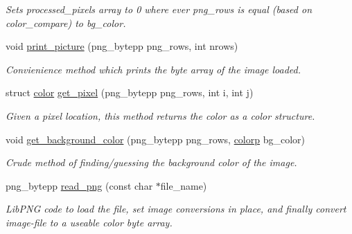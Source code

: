 \begin{DoxyCompactItemize}
\begin{DoxyCompactList}\small\item\em Sets processed\_\-pixels array to 0 where ever png\_\-rows is equal (based on color\_\-compare) to bg\_\-color. \item\end{DoxyCompactList}\item 
void \hyperlink{group__funcs_ga15a4db2e181f3ceef79a9bdd00d66866}{print\_\-picture} (png\_\-bytepp png\_\-rows, int nrows)
\begin{DoxyCompactList}\small\item\em Convienience method which prints the byte array of the image loaded. \item\end{DoxyCompactList}\item 
struct \hyperlink{structcolor}{color} \hyperlink{group__funcs_ga9f3d1acaa22f9aca948afcf487f6f850}{get\_\-pixel} (png\_\-bytepp png\_\-rows, int i, int j)
\begin{DoxyCompactList}\small\item\em Given a pixel location, this method returns the color as a color structure. \item\end{DoxyCompactList}\item 
void \hyperlink{group__funcs_gabc288f9283da15ec44a4200b0b1f0e7b}{get\_\-background\_\-color} (png\_\-bytepp png\_\-rows, \hyperlink{structcolor}{colorp} bg\_\-color)
\begin{DoxyCompactList}\small\item\em Crude method of finding/guessing the background color of the image. \item\end{DoxyCompactList}\item 
png\_\-bytepp \hyperlink{group__funcs_ga732414244cba6a9b064b73becc7dec97}{read\_\-png} (const char $\ast$file\_\-name)
\begin{DoxyCompactList}\small\item\em LibPNG code to load the file, set image conversions in place, and finally convert image-\/file to a useable color byte array. \item\end{DoxyCompactList}\end{DoxyCompactItemize}


